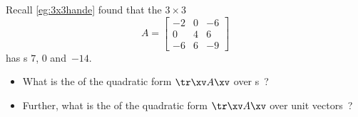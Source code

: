 \begin{activity}
Recall \autoref{eg:3x3hande} found that the \(3\times3\) 
\begin{equation*}
A=\begin{bmatrix} -2&0&-6\\0&4&6\\-6&6&-9 \end{bmatrix}
\end{equation*}
has s \(7\), \(0\) and~\(-14\).
\begin{itemize}
\item What is the  of the quadratic form \(\tr\xv A\xv\) over s~\xv?
\item Further, what is the  of the quadratic form \(\tr\xv A\xv\) over unit vectors~\xv?
\end{itemize}
\end{activity}



\begin{comment}
Could define positive/negative semi-definite forms/matrices.
But seems incidental so do not write yet.
\end{comment}




\begin{comment}  
Could have an optional application section on the following problem: useful whenever we can assess any pair of items, but do not have a framework for their absolute position.
Find \(m\) points in \(n\)D given that you know their distance
matrix and given that the mean location is precisely zero
\cite[p.83]{Hopcroft2014}. 
See \verb|multiDscaling.m|
\end{comment}







\sectionExercises


